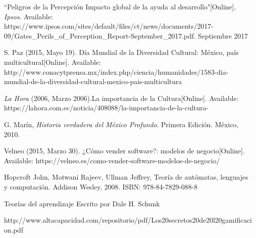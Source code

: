 \begin{thebibliography}{X}
	\textnormal{ ``Peligros de la Percepción Impacto global de la ayuda al desarrollo"[Online], \textit{Ipsos}. Available: https://www.ipsos.com/sites/default/files/ct/news/documents/2017-09/Gates\_Perils\_of\_Perception\_Report-September\_2017.pdf. Septiembre 2017 }	

	\textnormal{ S. Paz (2015, Mayo 19). Día Mundial de la Diversidad Cultural: México, país multicultural[Online]. Available: http://www.conacytprensa.mx/index.php/ciencia/humanidades/1583-dia-mundial-de-la-diversidad-cultural-mexico-pais-multicultura
	}

	\textnormal{ \textit{La Hora} (2006, Marzo 2006).La importancia de la Cultura[Online]. Available: https://lahora.com.ec/noticia/408088/la-importancia-de-la-cultura-
	}

	\textnormal{ G. Marín, \textit{Historia verdadera del México Profundo}. Primera Edición. México, 2010.
	}


	\textnormal Velneo (2015, Marzo 30). ¿Cómo vender software?: modelos de negocio[Online]. Available: https://velneo.es/como-vender-software-modelos-de-negocio/
	
	\textnormal	Hopcroft John, Motwani Rajeev, Ullman Jeffrey, Teoría de autómatas, lenguajes y computación. Addison Wesley, 2008. ISBN: 978-84-7829-088-8

	\textnormal	Teorías del aprendizaje	Escrito por Dale H. Schunk

	\textnormal	http://www.altacapacidad.com/repositorio/pdf/Los20secretos20de20l20gamificacion.pdf

\end{thebibliography}